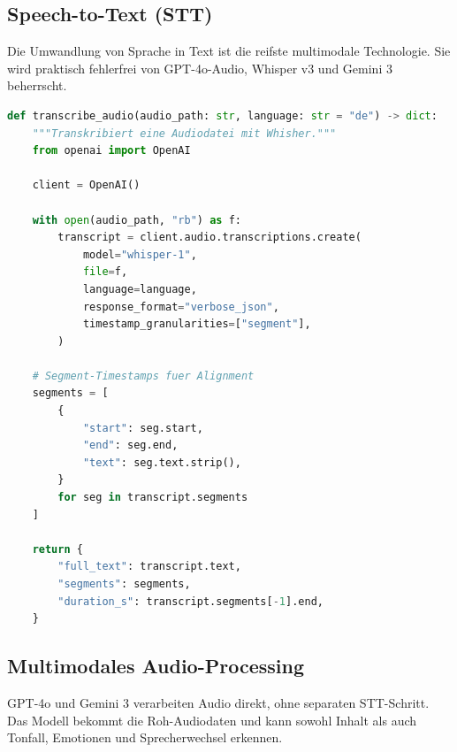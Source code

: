 \subsection{Speech-to-Text (STT)}

Die Umwandlung von Sprache in Text ist die reifste multimodale Technologie. Sie wird praktisch fehlerfrei von GPT-4o-Audio, Whisper v3 und Gemini 3 beherrscht.

\begin{lstlisting}[language=Python, caption=Audio-Transkription mit Whisper]
def transcribe_audio(audio_path: str, language: str = "de") -> dict:
    """Transkribiert eine Audiodatei mit Whisher."""
    from openai import OpenAI

    client = OpenAI()

    with open(audio_path, "rb") as f:
        transcript = client.audio.transcriptions.create(
            model="whisper-1",
            file=f,
            language=language,
            response_format="verbose_json",
            timestamp_granularities=["segment"],
        )

    # Segment-Timestamps fuer Alignment
    segments = [
        {
            "start": seg.start,
            "end": seg.end,
            "text": seg.text.strip(),
        }
        for seg in transcript.segments
    ]

    return {
        "full_text": transcript.text,
        "segments": segments,
        "duration_s": transcript.segments[-1].end,
    }
\end{lstlisting}

\subsection{Multimodales Audio-Processing}

GPT-4o und Gemini 3 verarbeiten Audio direkt, ohne separaten STT-Schritt. Das Modell bekommt die Roh-Audiodaten und kann sowohl Inhalt als auch Tonfall, Emotionen und Sprecherwechsel erkennen.

